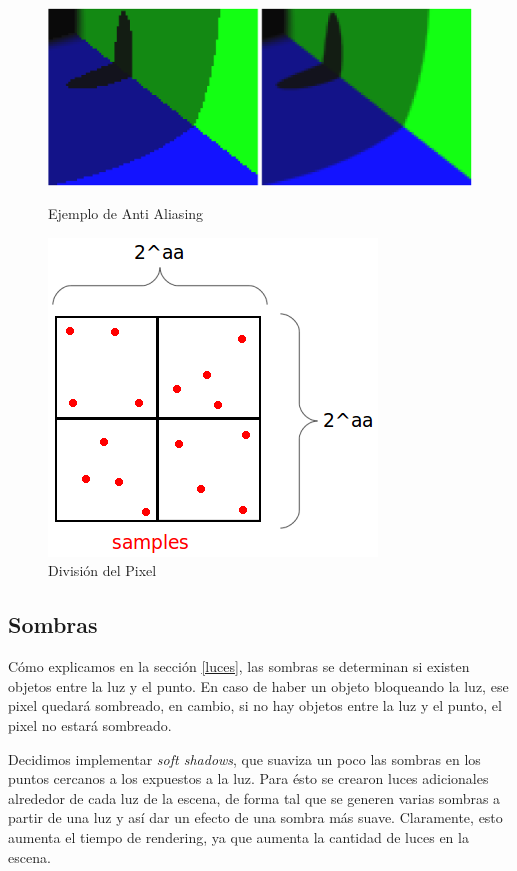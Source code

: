 \documentclass[a4paper,10pt]{article}
\begin{document}
\begin{figure}[ht]
\begin{minipage}[b]{0.5\linewidth}
\centering
\includegraphics[scale=0.23]{aa_muestra.png}
\caption{Ejemplo de Anti Aliasing}
\label{fig:figure7}
\end{minipage}
\hspace{0.5cm}
\begin{minipage}[b]{0.5\linewidth}
\centering
\includegraphics[scale=0.40]{aa_samples.png}
\caption{Divisi\'on del Pixel}
\label{fig:figure8}
\end{minipage}
\end{figure}

\subsection{Sombras}

C\'omo explicamos en la secci\'on \ref{luces}, las sombras se determinan si
existen objetos entre la luz y el punto.  En caso de haber un objeto bloqueando
la luz, ese pixel quedar\'a sombreado, en cambio, si no hay objetos entre la
luz y el punto, el pixel no estar\'a sombreado.

Decidimos implementar \emph{soft shadows}, que suaviza un poco las sombras en
los puntos cercanos a los expuestos a la luz. Para \'esto se crearon luces
adicionales
alrededor de cada luz de la escena, de forma tal que se generen varias sombras a
partir de una luz y as\'i dar un efecto de una sombra m\'as suave. Claramente, 
esto aumenta el tiempo de rendering, ya que aumenta la cantidad de luces en
la escena.
\end{document}
